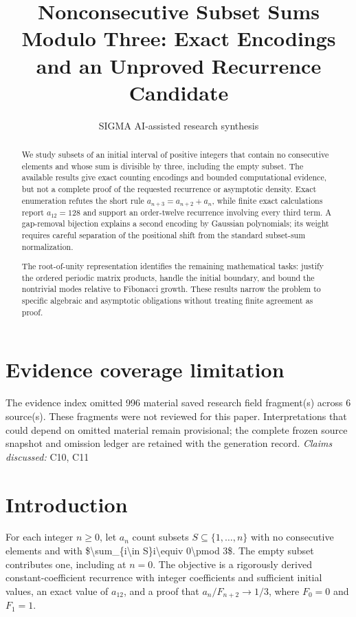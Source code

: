\documentclass[11pt]{article}
\title{Nonconsecutive Subset Sums Modulo Three: Exact Encodings and an Unproved Recurrence Candidate}
\date{}
\author{SIGMA AI-assisted research synthesis}
\begin{document}
\maketitle

\begin{abstract}
We study subsets of an initial interval of positive integers that contain no consecutive elements and whose sum is divisible by three, including the empty subset. The available results give exact counting encodings and bounded computational evidence, but not a complete proof of the requested recurrence or asymptotic density. Exact enumeration refutes the short rule $a_{n+3}=a_{n+2}+a_n$, while finite exact calculations report $a_{12}=128$ and support an order-twelve recurrence involving every third term. A gap-removal bijection explains a second encoding by Gaussian polynomials; its weight requires careful separation of the positional shift from the standard subset-sum normalization.

The root-of-unity representation identifies the remaining mathematical tasks: justify the ordered periodic matrix products, handle the initial boundary, and bound the nontrivial modes relative to Fibonacci growth. These results narrow the problem to specific algebraic and asymptotic obligations without treating finite agreement as proof.
\end{abstract}
\section*{Evidence coverage limitation}
The evidence index omitted 996 material saved research field fragment(s) across 6 source(s). These fragments were not reviewed for this paper. Interpretations that could depend on omitted material remain provisional; the complete frozen source snapshot and omission ledger are retained with the generation record.
\textit{Claims discussed: }C10, C11
\section{Introduction}
For each integer $n\geq 0$, let $a_n$ count subsets $S\subseteq\{1,\ldots,n\}$ with no consecutive elements and with \$\textbackslash{}sum\_\{i\textbackslash{}in S\}i\textbackslash{}equiv 0\textbackslash{}pmod 3\$. The empty subset contributes one, including at $n=0$. The objective is a rigorously derived constant-coefficient recurrence with integer coefficients and sufficient initial values, an exact value of $a_{12}$, and a proof that $a_n/F_{n+2}\to 1/3$, where $F_0=0$ and $F_1=1$.
\end{document}
